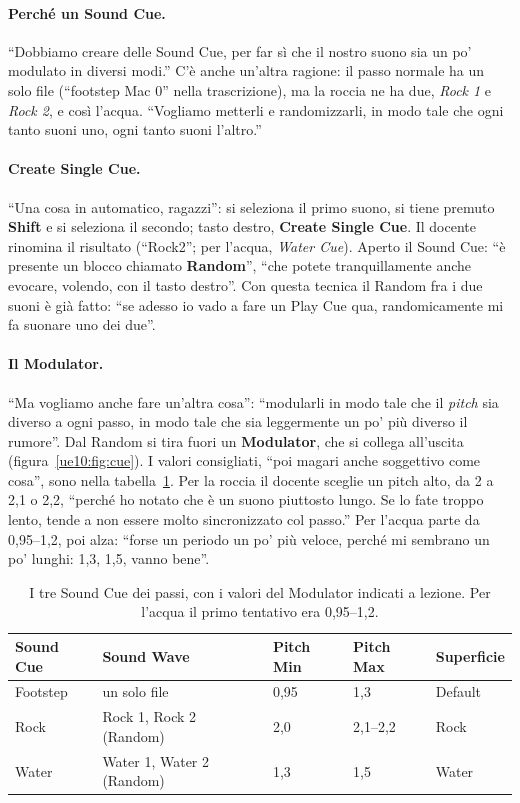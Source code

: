\paragraph{Perché un Sound Cue.} ``Dobbiamo creare delle Sound Cue, per far sì che il
nostro suono sia un po' modulato in diversi modi.'' C'è anche un'altra ragione: il passo
normale ha un solo file (``footstep Mac 0'' nella trascrizione), ma la roccia ne ha due,
\emph{Rock 1} e \emph{Rock 2}, e così l'acqua. ``Vogliamo metterli e randomizzarli, in
modo tale che ogni tanto suoni uno, ogni tanto suoni l'altro.''

\paragraph{Create Single Cue.} ``Una cosa in automatico, ragazzi'': si seleziona il primo
suono, si tiene premuto \textbf{Shift} e si seleziona il secondo; tasto destro,
\textbf{Create Single Cue}. Il docente rinomina il risultato (``Rock2''; per l'acqua,
\emph{Water Cue}). Aperto il Sound Cue: ``è presente un blocco chiamato \textbf{Random}'',
``che potete tranquillamente anche evocare, volendo, con il tasto destro''. Con questa
tecnica il Random fra i due suoni è già fatto: ``se adesso io vado a fare un Play Cue qua,
randomicamente mi fa suonare uno dei due''.

\paragraph{Il Modulator.} ``Ma vogliamo anche fare un'altra cosa'': ``modularli in modo tale
che il \emph{pitch} sia diverso a ogni passo, in modo tale che sia leggermente un po' più
diverso il rumore''. Dal Random si tira fuori un \textbf{Modulator}, che si collega
all'uscita (figura~\ref{ue10:fig:cue}). I valori consigliati, ``poi magari anche
soggettivo come cosa'', sono nella tabella~\ref{ue10:tab:cue}. Per la roccia il docente
sceglie un pitch alto, da 2 a 2,1 o 2,2, ``perché ho notato che è un suono piuttosto
lungo. Se lo fate troppo lento, tende a non essere molto sincronizzato col passo.'' Per
l'acqua parte da 0,95--1,2, poi alza: ``forse un periodo un po' più veloce, perché mi
sembrano un po' lunghi: 1,3, 1,5, vanno bene''.

\begin{table}[htbp]
\centering
\small
\begin{tabular}{@{}p{3.0cm}p{3.2cm}p{2.2cm}p{2.2cm}p{3.0cm}@{}}
\toprule
\textbf{Sound Cue} & \textbf{Sound Wave} & \textbf{Pitch Min} & \textbf{Pitch Max} &
\textbf{Superficie} \\
\midrule
Footstep & un solo file & 0,95 & 1,3 & Default \\
Rock & Rock 1, Rock 2 (Random) & 2,0 & 2,1--2,2 & Rock \\
Water & Water 1, Water 2 (Random) & 1,3 & 1,5 & Water \\
\bottomrule
\end{tabular}
\caption{I tre Sound Cue dei passi, con i valori del Modulator indicati a lezione. Per
l'acqua il primo tentativo era 0,95--1,2.}
\label{ue10:tab:cue}
\end{table}

